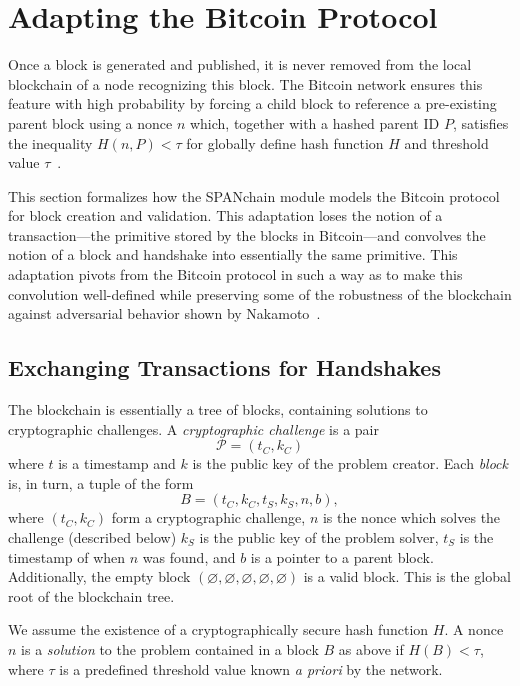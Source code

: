\section{Adapting the Bitcoin Protocol}
\label{sec:blockchain}

Once a block is generated and published,
it is never removed from the local blockchain of a node recognizing
this block. The Bitcoin network ensures this feature with high
probability by forcing a child block to reference a pre-existing parent
block using a nonce $n$ which, together with a hashed parent ID $P$, satisfies
the inequality $H(n,P)<\tau$ for globally define hash function $H$ and
threshold value $\tau$~\cite{nakamoto2008bitcoin}.

This section formalizes how the SPANchain module models the Bitcoin protocol
for block creation and validation. This adaptation loses the notion of
a transaction---the primitive stored by the blocks in Bitcoin---and convolves the notion
of a block and handshake into essentially the same primitive. This adaptation
pivots from the Bitcoin protocol in such a way as to make this convolution
well-defined while preserving some of the robustness of the blockchain against
adversarial behavior shown by Nakamoto~\cite{nakamoto2008bitcoin}.

\subsection{Exchanging Transactions for Handshakes}

The blockchain is essentially a tree of blocks,
containing solutions to cryptographic challenges.
A \emph{cryptographic challenge} is a pair
\begin{equation*}
	\mathcal P = (t_C, k_C)
\end{equation*}
where $t$ is a timestamp and $k$ is the public key of the problem creator.
Each \emph{block} is, in turn, a tuple of the form
\begin{equation*}
	B = (t_C, k_C, t_S, k_S, n, b),
\end{equation*}
where $(t_C, k_C)$ form a cryptographic challenge,
$n$ is the nonce which solves the challenge (described below)
$k_S$ is the public key of the problem solver,
$t_S$ is the timestamp of when $n$ was found,
and $b$ is a pointer to a parent block.
Additionally,
the empty block $(\varnothing, \varnothing, \varnothing, \varnothing, \varnothing)$
is a valid block.
This is the global root of the blockchain tree.

We assume the existence of a cryptographically secure hash function $H$.
A nonce $n$ is a \emph{solution} to the problem contained in a block $B$ as above
if $H(B) < \tau$,
where $\tau$ is a predefined threshold value known \emph{a priori} by the network.

